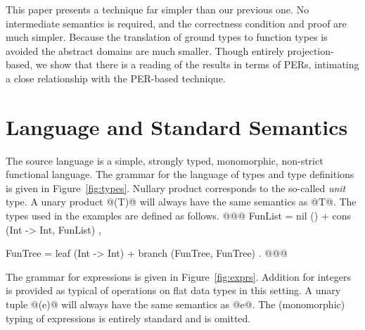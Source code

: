 \documentclass[11pt]{article}
\begin{document}
This paper presents a technique far simpler than our
previous one.  No intermediate semantics is required, and the
correctness condition and proof are much simpler.  Because the
translation of ground types to function types is avoided the abstract
domains are much smaller. Though entirely projection-based, we show
that there is a reading of the results in terms of PERs, intimating a
close relationship with the PER-based technique.

\section{Language and Standard Semantics}

The source language is a simple, strongly typed, monomorphic,
non-strict functional language.  The grammar for the language of types
and type definitions is given in Figure~\ref{fig:types}.
Nullary product corresponds to the so-called {\it unit\/} type.  A
unary product @(T)@ will always have the same semantics as @T@.  The
types used in the examples are defined as follows.
@@@
     FunList =   nil () 
               + cons (Int -> Int, FunList) , 

     FunTree =   leaf (Int -> Int) 
	       + branch (FunTree, FunTree) .
@@@

The grammar for expressions is given in Figure~\ref{fig:exprs}.
Addition for integers is provided as typical of operations on flat data
types in this setting.  A unary tuple @(e)@ will always have the same
semantics as @e@.  The (monomorphic) typing of expressions is entirely
standard and is omitted.
\end{document}
